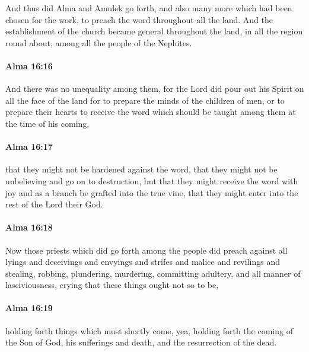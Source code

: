 			And thus did Alma and Amulek go forth,
			and also many more which had been chosen for the work,
			to preach the word throughout all the land.
			And the establishment of the church became general throughout the land,
			in all the region round about, among all the people of the Nephites.

		\paragraph{Alma 16:16} %
			\label{ALMA-16-16}

			And there was no unequality among them,
			for the Lord did pour out his Spirit on all the face of the land
			for to prepare the minds of the children of men,
			or to prepare their hearts to receive the word
			which should be taught among them at the time of his coming,

		\paragraph{Alma 16:17} %
			\label{ALMA-16-17}

			that they might not be hardened against the word,
			that they might not be unbelieving and go on to destruction,
			but that they might receive the word with joy
			and as a branch be grafted into the true vine,
			that they might enter into the rest of the Lord their God.

		\paragraph{Alma 16:18} %
			\label{ALMA-16-18}

			Now those priests which did go forth among the people did preach
			against all lyings and deceivings and envyings and strifes and malice and revilings
			and stealing, robbing, plundering, murdering, committing adultery,
			and all manner of lasciviousness,
			crying that these things ought not so to be,

		\paragraph{Alma 16:19} %
			\label{ALMA-16-19}

			holding forth things which must shortly come,
			yea, holding forth the coming of the Son of God, his sufferings and death,
			and the resurrection of the dead.

